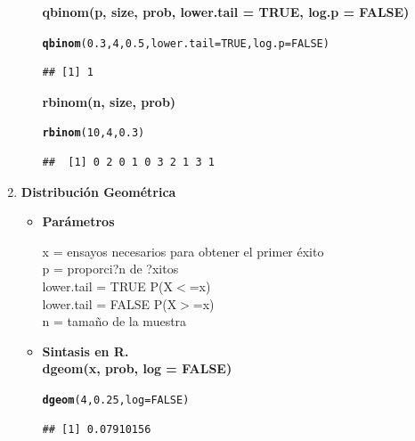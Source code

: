\documentclass[12pt,letterpaper]{article}\usepackage[]{graphicx}\usepackage[]{color}
\makeatletter
\newcommand{\hlnum}[1]{\textcolor[rgb]{0.686,0.059,0.569}{#1}}%
\newcommand{\hlstd}[1]{\textcolor[rgb]{0.345,0.345,0.345}{#1}}%
\newcommand{\hlkwc}[1]{\textcolor[rgb]{0.333,0.667,0.333}{#1}}%
\newcommand{\hlkwd}[1]{\textcolor[rgb]{0.737,0.353,0.396}{\textbf{#1}}}%
\newenvironment{kframe}{%
 \def\at@end@of@kframe{}%
 \ifinner\ifhmode%
  \def\at@end@of@kframe{\end{minipage}}%
  \begin{minipage}{\columnwidth}%
 \fi\fi%
 \def\FrameCommand##1{\hskip\@totalleftmargin \hskip-\fboxsep
 \colorbox{shadecolor}{##1}\hskip-\fboxsep
     \hskip-\linewidth \hskip-\@totalleftmargin \hskip\columnwidth}%
 \MakeFramed {\advance\hsize-\width
   \@totalleftmargin\z@ \linewidth\hsize
   \@setminipage}}%
 {\par\unskip\endMakeFramed%
 \at@end@of@kframe}
\newenvironment{knitrout}{}{} %
\makeatother
\begin{document}
\begin{enumerate}
\begin{itemize}
\textbf{qbinom(p, size, prob, lower.tail = TRUE, log.p = FALSE)}
\begin{knitrout}
\color{fgcolor}\begin{kframe}
\begin{alltt}
\hlkwd{qbinom}\hlstd{(}\hlnum{0.3}\hlstd{,} \hlnum{4}\hlstd{,} \hlnum{0.5}\hlstd{,} \hlkwc{lower.tail} \hlstd{=} \hlnum{TRUE}\hlstd{,} \hlkwc{log.p} \hlstd{=} \hlnum{FALSE}\hlstd{)}
\end{alltt}
\begin{verbatim}
## [1] 1
\end{verbatim}
\end{kframe}
\end{knitrout}

\textbf{rbinom(n, size, prob)} 
\begin{knitrout}
\color{fgcolor}\begin{kframe}
\begin{alltt}
\hlkwd{rbinom}\hlstd{(}\hlnum{10}\hlstd{,} \hlnum{4}\hlstd{,} \hlnum{0.3}\hlstd{)}
\end{alltt}
\begin{verbatim}
##  [1] 0 2 0 1 0 3 2 1 3 1
\end{verbatim}
\end{kframe}
\end{knitrout}

\end{itemize}

\item  \textbf{Distribuci\'on Geom\'etrica}
\begin{itemize}
\item \textbf{Par\'ametros}
\begin{center}
x = ensayos necesarios para obtener el primer \'exito\\
p = proporci?n de ?xitos\\
lower.tail = TRUE P(X$<$=x)\\
lower.tail = FALSE P(X$>$=x)\\ 
n = tama\~no de la muestra 
\end{center}
  
\item \textbf{Sintasis en R.}\\

\textbf{dgeom(x, prob, log = FALSE)}
\begin{knitrout}
\color{fgcolor}\begin{kframe}
\begin{alltt}
\hlkwd{dgeom}\hlstd{(}\hlnum{4}\hlstd{,} \hlnum{0.25}\hlstd{,} \hlkwc{log} \hlstd{=} \hlnum{FALSE}\hlstd{)}
\end{alltt}
\begin{verbatim}
## [1] 0.07910156
\end{verbatim}
\end{kframe}
\end{knitrout}


\end{itemize}
\end{enumerate}
\end{document}
